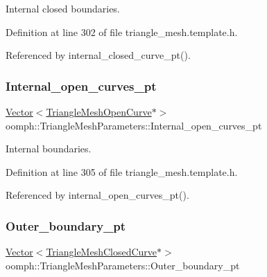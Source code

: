 Internal closed boundaries. 



Definition at line 302 of file triangle\+\_\+mesh.\+template.\+h.



Referenced by internal\+\_\+closed\+\_\+curve\+\_\+pt().

\mbox{\label{classoomph_1_1TriangleMeshParameters_af6a11e437a5c14d6c160160cf2a3c79a}} 
\subsubsection{\texorpdfstring{Internal\+\_\+open\+\_\+curves\+\_\+pt}{Internal\_open\_curves\_pt}}
{\footnotesize\ttfamily \hyperlink{classoomph_1_1Vector}{Vector}$<$\hyperlink{classoomph_1_1TriangleMeshOpenCurve}{Triangle\+Mesh\+Open\+Curve}$\ast$$>$ oomph\+::\+Triangle\+Mesh\+Parameters\+::\+Internal\+\_\+open\+\_\+curves\+\_\+pt\hspace{0.3cm}{\ttfamily [protected]}}



Internal boundaries. 



Definition at line 305 of file triangle\+\_\+mesh.\+template.\+h.



Referenced by internal\+\_\+open\+\_\+curves\+\_\+pt().

\mbox{\label{classoomph_1_1TriangleMeshParameters_ab68819894ffa01f268c2ef861a45e108}} 
\subsubsection{\texorpdfstring{Outer\+\_\+boundary\+\_\+pt}{Outer\_boundary\_pt}}
{\footnotesize\ttfamily \hyperlink{classoomph_1_1Vector}{Vector}$<$\hyperlink{classoomph_1_1TriangleMeshClosedCurve}{Triangle\+Mesh\+Closed\+Curve}$\ast$$>$ oomph\+::\+Triangle\+Mesh\+Parameters\+::\+Outer\+\_\+boundary\+\_\+pt\hspace{0.3cm}{\ttfamily [protected]}}



